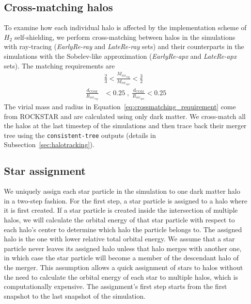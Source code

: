 \documentclass[linenumbers, twocolumn]{aastex631}
\begin{document}
\subsection{Cross-matching halos}
\label{subsect:cross-matching_halos}
To examine how each individual halo is affected by the implementation scheme of $H_{2}$ self-shielding, we perform cross-matching between halos in the simulations with ray-tracing (\textit{EarlyRe-ray} and \textit{LateRe-ray} sets) and their counterparts in the simulations with the Sobelev-like approximation (\textit{EarlyRe-apx} and \textit{LateRe-apx} sets). The matching requirements are
\begin{align}
    & \frac{2}{3} < \frac{M_{vir_{ray}}}{M_{vir_{apx}}} < \frac{3}{2} \nonumber \\
    \frac{d_{\text{COM}}}{R_{vir_{ray}}} & < 0.25 \; , \; \frac{d_{\text{COM}}}{R_{vir_{apx}}} < 0.25 
\label{eq:crossmatching_requirement}
\end{align}
The virial mass and radius in Equation~\ref{eq:crossmatching_requirement} come from ROCKSTAR and are calculated using only dark matter. We cross-match all the halos at the last timestep of the simulations and then trace back their merger tree using the \texttt{consistent-tree} outputs (details in Subsection~\ref{sec:halotracking}).

\subsection{Star assignment}
\label{subsect:star_assignment}

We uniquely assign each star particle in the simulation to one dark matter halo in a two-step fashion. For the first step, a star particle is assigned to a halo where it is first created. If a star particle is created inside the intersection of multiple halos, we will calculate the orbital energy of that star particle with respect to each halo's center to determine which halo the particle belongs to. The assigned halo is the one with lower relative total orbital energy. We assume that a star particle never leaves its assigned halo unless that halo merges with another one, in which case the star particle will become a member of the descendant halo of the merger. This assumption allows a quick assignment of stars to halos without the need to calculate the orbital energy of each star to multiple halos, which is computationally expensive. The assignment's first step starts from the first snapshot to the last snapshot of the simulation. 
\end{document}
